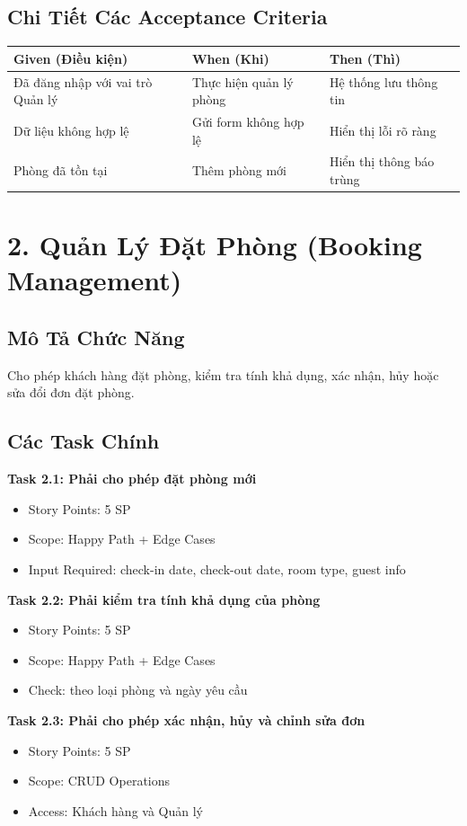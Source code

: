 \documentclass[12pt, a4paper]{report}
\begin{document}
\subsection{Chi Tiết Các Acceptance Criteria}

\begin{table}[h]
\centering
\begin{tabular}{|p{3cm}|p{4cm}|p{3cm}|}
\hline
\textbf{Given (Điều kiện)} & \textbf{When (Khi)} & \textbf{Then (Thì)} \\
\hline
Đã đăng nhập với vai trò Quản lý & Thực hiện quản lý phòng & Hệ thống lưu thông tin \\
\hline
Dữ liệu không hợp lệ & Gửi form không hợp lệ & Hiển thị lỗi rõ ràng \\
\hline
Phòng đã tồn tại & Thêm phòng mới & Hiển thị thông báo trùng \\
\hline
\end{tabular}
\end{table}

\section{2. Quản Lý Đặt Phòng (Booking Management)}

\subsection{Mô Tả Chức Năng}

Cho phép khách hàng đặt phòng, kiểm tra tính khả dụng, xác nhận, hủy hoặc sửa đổi đơn đặt phòng.

\subsection{Các Task Chính}

\begin{tcolorbox}[colback=orange!5, colframe=orange!50]
\textbf{Task 2.1: Phải cho phép đặt phòng mới}
\begin{itemize}
    \item Story Points: 5 SP
    \item Scope: Happy Path + Edge Cases
    \item Input Required: check-in date, check-out date, room type, guest info
\end{itemize}

\textbf{Task 2.2: Phải kiểm tra tính khả dụng của phòng}
\begin{itemize}
    \item Story Points: 5 SP
    \item Scope: Happy Path + Edge Cases
    \item Check: theo loại phòng và ngày yêu cầu
\end{itemize}

\textbf{Task 2.3: Phải cho phép xác nhận, hủy và chỉnh sửa đơn}
\begin{itemize}
    \item Story Points: 5 SP
    \item Scope: CRUD Operations
    \item Access: Khách hàng và Quản lý
\end{itemize}
\end{tcolorbox}
\end{document}
